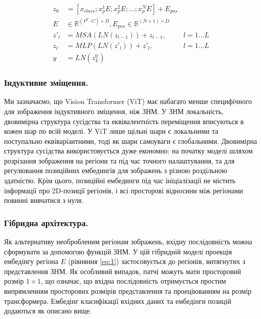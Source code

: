\begin{align}
    z_0 &= [x_{{class}};x_p^1 E;x_p^2 E; ...; x_p^N E] +E_{pos} \label{eq:1}\\
    E &\in \mathbb{R}^{(P^2 \cdot C)\times D},
    E_{pos} \in \mathbb{R}^{(N+1)\times D} \nonumber\\
    z'_l &= {MSA}({LN}(z_{l-1})) + z_{l-1}, &l=1...L \label{eq:2}\\
    z_l &= {MLP}({LN(z'_l)})+z'_l, &l=1...L \label{eq:3}\\
    y &= {LN}(z_L^0) \label{eq:4}
\end{align}

\subsubsection{Індуктивне зміщення.}
Ми зазначаємо, що Vision Transformer (ViT) має набагато менше
специфічного для зображення індуктивного зміщення, ніж ЗНМ.
У ЗНМ локальність, двовимірна структура сусідства
та еквівалентність переміщення вписуються в кожен шар по всій моделі.
У ViT лише щільні шари є локальними та поступально еквіваріантними,
тоді як шари самоуваги є глобальними. Двовимірна структура сусідства
використовується дуже економно: на початку моделі шляхом
розрізання зображення на регіони та під час точного налаштування,
та для регулювання позиційних ембедингів для зображень з
різною роздільною здатністю.
Крім цього, позиційні ембединги під час ініціалізації
не містить інформації про 2D-позиції регіонів,
і всі просторові відносини між регіонами повинні вивчатися з нуля.

\subsubsection{Гібридна архітектура.}
Як альтернативу необробленим регіонам зображень,
вхідну послідовність можна сформувати за допомогою функцій ЗНМ.
У цій гібридній моделі проекція ембедінгу регіона $E$
(рівняння \ref{eq:1}) застосовується до регіонів,
витягнутих з представлення ЗНМ. Як особливий випадок, патчі можуть
мати просторовий розмір $1 \times 1$, що означає, що вхідна
послідовність отримується простим випрямленням просторових
розмірів представлення та проеціюванням на розмір трансформера.
Ембедінг класифікації вхідних даних та ембедінги
позицій додаються як описано вище.

